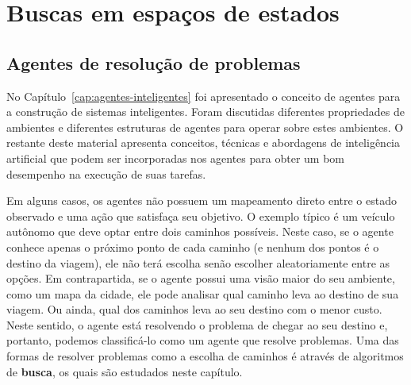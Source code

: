 \chapter{Buscas em espaços de estados}
\label{cap:buscas}


\section{Agentes de resolução de problemas}

No Capítulo~\ref{cap:agentes-inteligentes} foi apresentado o conceito de agentes para a construção de sistemas inteligentes. Foram discutidas diferentes propriedades de ambientes e diferentes estruturas de agentes para operar sobre estes ambientes. O restante deste material apresenta conceitos, técnicas e abordagens de inteligência artificial que podem ser incorporadas nos agentes para obter um bom desempenho na execução de suas tarefas.

Em alguns casos, os agentes não possuem um mapeamento direto entre o estado observado e uma ação que satisfaça seu objetivo. O exemplo típico é um veículo autônomo que deve optar entre dois caminhos possíveis. Neste caso, se o agente conhece apenas o próximo ponto de cada caminho (e nenhum dos pontos é o destino da viagem), ele não terá escolha senão escolher aleatoriamente entre as opções. Em contrapartida, se o agente possui uma visão maior do seu ambiente, como um mapa da cidade, ele pode analisar qual caminho leva ao destino de sua viagem. Ou ainda, qual dos caminhos leva ao seu destino com o menor custo. Neste sentido, o agente está resolvendo o problema de chegar ao seu destino e, portanto, podemos classificá-lo como um agente que resolve problemas. Uma das formas de resolver problemas como a escolha de caminhos é através de algoritmos de \textbf{busca}, os quais são estudados neste capítulo.

